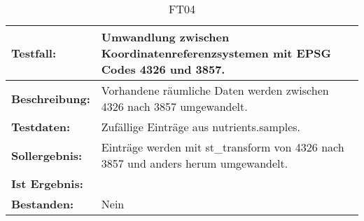 \begin{table}[h!]
\centering
\small
\begin{tabular}{p{2.8cm}|p{12cm}}
\textbf{Testfall:} & Umwandlung zwischen Koordinatenreferenzsystemen mit EPSG Codes 4326 und 3857. \\ \hline
\textbf{Beschreibung:} & Vorhandene räumliche Daten werden zwischen 4326 nach 3857 umgewandelt. \\ \hline
\textbf{Testdaten:} & Zufällige Einträge aus nutrients.samples. \\ \hline
\textbf{Sollergebnis:} & Einträge werden mit st\_{}transform von 4326 nach 3857 und anders herum umgewandelt. \\ \hline
\textbf{Ist Ergebnis:} &  \\ \hline
\textbf{Bestanden:} & Nein \\
\end{tabular}
\caption*{FT04}
\end{table}

\capstarttrue
\newpage